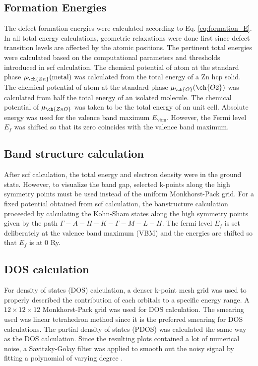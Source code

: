 \subsection{Formation Energies}
The defect formation energies were calculated according to Eq. \eqref{eq:formation_E}. In all total energy calculations, geometric relaxations were done first since defect transition levels are affected by the atomic positions. The pertinent total energies were calculated based on the computational parameters and thresholds introduced in scf calculation. The chemical potential of  atom at the standard phase $\mu_{\ch{Zn}}(\text{metal})$ was calculated from the total energy of a Zn hcp solid. The chemical potential of  atom at the standard phase
$\mu_{\ch{O}}(\ch{O2})$ was calculated from  half the total energy of an isolated  molecule. The chemical potential of $\mu_{\ch{ZnO}}$ was taken to be the total energy of an unit cell. Absolute energy was used for the valence band maximum $E_{\text{vbm}}$. However, the Fermi level $E_f$ was shifted so that its zero coincides with the valence band maximum.

\subsection{Band structure calculation}
After scf calculation, the total energy and electron density were in the ground state. However, to visualize the band gap, selected k-points along the high symmetry points must be used instead of the uniform Monkhorst-Pack grid. For a fixed potential obtained from scf calculation, the banstructure calculation proceeded by calculating the Kohn-Sham states along the high symmetry points given by the path $\Gamma-A-H-K-\Gamma-M-L-H$. The fermi level $E_f$ is set deliberately at the valence band maximum (VBM) and the energies are shifted so that $E_f$ is at  0 Ry.

\subsection{DOS calculation}
For density of states (DOS) calculation, a denser k-point mesh grid was used to properly described the contribution of each orbitals to a  specific energy range. A $12 \times 12 \times 12$ Monkhorst-Pack grid was used for DOS calculation. The smearing used was linear tetrahedron method since it is the preferred smearing for DOS calculations. The partial density of states (PDOS) was calculated the same way as the  DOS calculation. Since the resulting plots contained a lot of numerical noise, a Savitzky-Golay filter was applied to smooth out the noisy signal by fitting a polynomial of varying degree \citep{Savitzky1964,Luo2005}.

